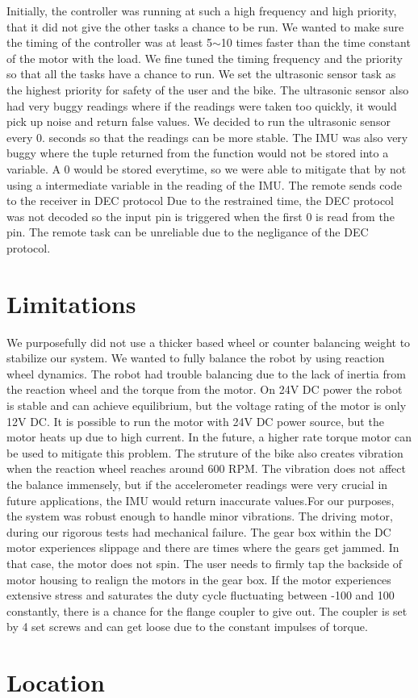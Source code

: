 Initially, the controller was running at such a high frequency and high priority, that it did not give the other tasks a chance to be run. We wanted to make sure the timing of the controller was at least 5$\sim$10 times faster than the time constant of the motor with the load. We fine tuned the timing frequency and the priority so that all the tasks have a chance to run. We set the ultrasonic sensor task as the highest priority for safety of the user and the bike. The ultrasonic sensor also had very buggy readings where if the readings were taken too quickly, it would pick up noise and return false values. We decided to run the ultrasonic sensor every 0. seconds so that the readings can be more stable. The I\+MU was also very buggy where the tuple returned from the function would not be stored into a variable. A 0 would be stored everytime, so we were able to mitigate that by not using a intermediate variable in the reading of the I\+MU. The remote sends code to the receiver in D\+EC protocol Due to the restrained time, the D\+EC protocol was not decoded so the input pin is triggered when the first 0 is read from the pin. The remote task can be unreliable due to the negligance of the D\+EC protocol.\hypertarget{index_sec_lim}{}\section{Limitations}\label{index_sec_lim}
We purposefully did not use a thicker based wheel or counter balancing weight to stabilize our system. We wanted to fully balance the robot by using reaction wheel dynamics. The robot had trouble balancing due to the lack of inertia from the reaction wheel and the torque from the motor. On 24V DC power the robot is stable and can achieve equilibrium, but the voltage rating of the motor is only 12V DC. It is possible to run the motor with 24V DC power source, but the motor heats up due to high current. In the future, a higher rate torque motor can be used to mitigate this problem. The struture of the bike also creates vibration when the reaction wheel reaches around 600 R\+PM. The vibration does not affect the balance immensely, but if the accelerometer readings were very crucial in future applications, the I\+MU would return inaccurate values.\+For our purposes, the system was robust enough to handle minor vibrations. The driving motor, during our rigorous tests had mechanical failure. The gear box within the DC motor experiences slippage and there are times where the gears get jammed. In that case, the motor does not spin. The user needs to firmly tap the backside of motor housing to realign the motors in the gear box. If the motor experiences extensive stress and saturates the duty cycle fluctuating between -\/100 and 100 constantly, there is a chance for the flange coupler to give out. The coupler is set by 4 set screws and can get loose due to the constant impulses of torque.\hypertarget{index_sec_loc}{}\section{Location}\label{index_sec_loc}
